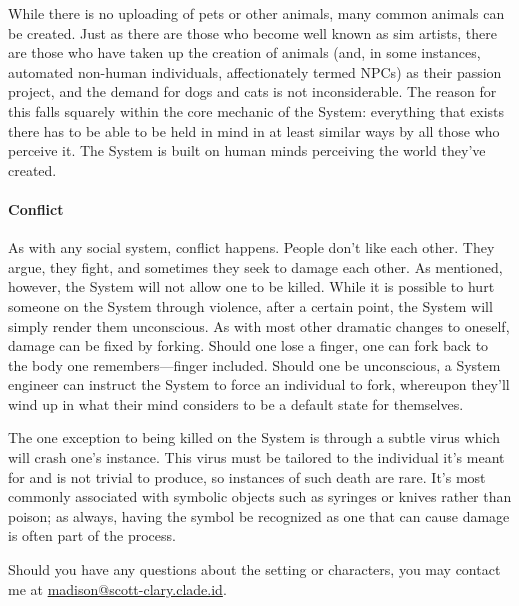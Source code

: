 While there is no uploading of pets or other animals, many common animals can be created. Just as there are those who become well known as sim artists, there are those who have taken up the creation of animals (and, in some instances, automated non-human individuals, affectionately termed NPCs) as their passion project, and the demand for dogs and cats is not inconsiderable. The reason for this falls squarely within the core mechanic of the System: everything that exists there has to be able to be held in mind in at least similar ways by all those who perceive it. The System is built on human minds perceiving the world they've created.

\paragraph{Conflict}

As with any social system, conflict happens. People don't like each other. They argue, they fight, and sometimes they seek to damage each other. As mentioned, however, the System will not allow one to be killed. While it is possible to hurt someone on the System through violence, after a certain point, the System will simply render them unconscious. As with most other dramatic changes to oneself, damage can be fixed by forking. Should one lose a finger, one can fork back to the body one remembers---finger included. Should one be unconscious, a System engineer can instruct the System to force an individual to fork, whereupon they'll wind up in what their mind considers to be a default state for themselves.

The one exception to being killed on the System is through a subtle virus which will crash one's instance. This virus must be tailored to the individual it's meant for and is not trivial to produce, so instances of such death are rare. It's most commonly associated with symbolic objects such as syringes or knives rather than poison; as always, having the symbol be recognized as one that can cause damage is often part of the process.

\secdiv

\noindent Should you have any questions about the setting or characters, you may contact me at \href{mailto:mscottclary@clade.id}{madison@scott-clary.clade.id}.
